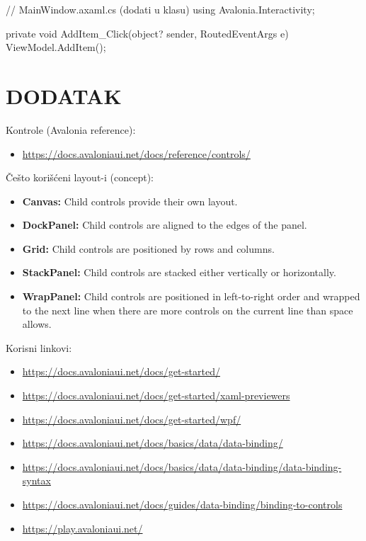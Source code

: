 \documentclass[11pt,a4paper]{article}
\begin{document}
\begin{CodeBlock}
// MainWindow.axaml.cs (dodati u klasu)
using Avalonia.Interactivity;

private void AddItem_Click(object? sender, RoutedEventArgs e)
{
    ViewModel.AddItem();
}
\end{CodeBlock}

\section*{DODATAK}

Kontrole (Avalonia reference):

\begin{itemize}[leftmargin=*]
  \item \url{https://docs.avaloniaui.net/docs/reference/controls/}
\end{itemize}

Češto korišćeni layout-i (concept):

\begin{itemize}[leftmargin=*]
  \item \textbf{Canvas:} Child controls provide their own layout.
  \item \textbf{DockPanel:} Child controls are aligned to the edges of the panel.
  \item \textbf{Grid:} Child controls are positioned by rows and columns.
  \item \textbf{StackPanel:} Child controls are stacked either vertically or horizontally.
  \item \textbf{WrapPanel:} Child controls are positioned in left-to-right order and wrapped to the next line when there are more controls on the current line than space allows.
\end{itemize}

Korisni linkovi:

\begin{itemize}[leftmargin=*]
  \item \url{https://docs.avaloniaui.net/docs/get-started/}
  \item \url{https://docs.avaloniaui.net/docs/get-started/xaml-previewers}
  \item \url{https://docs.avaloniaui.net/docs/get-started/wpf/}
  \item \url{https://docs.avaloniaui.net/docs/basics/data/data-binding/}
  \item \url{https://docs.avaloniaui.net/docs/basics/data/data-binding/data-binding-syntax}
  \item \url{https://docs.avaloniaui.net/docs/guides/data-binding/binding-to-controls}
  \item \url{https://play.avaloniaui.net/}
\end{itemize}
\end{document}
